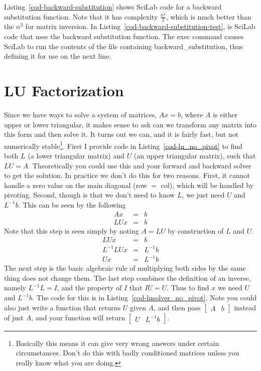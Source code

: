 Listing~\ref{cod-backward-substitution} shows SciLab code for a backward substitution function.  Note that it has complexity $\frac{n^2}{2}$, which is much better than the $n^3$ for matrix inversion.  In Listing~\ref{cod-backward-substitution-test}, is SciLab code that uses the backward substitution function.  The exec command causes SciLab to run the contents of the file containing backward\_substitution, thus defining it for use on the next line.

\section{LU Factorization}

Since we have ways to solve a system of matrices, $Ax=b$, where $A$ is either upper or lower triangular, it makes sense to ask can we transform any matrix into this form and then solve it.  It turns out we can, and it is fairly fast, but not numerically stable\footnote{Basically this means it can give very wrong answers under certain circumstances.  Don't do this with badly conditioned matrices unless you really know what you are doing.}.  First I provide code in Listing~\ref{cod-lu_no_pivot} to find both $L$ (a lower triangular matrix) and $U$ (an upper triangular matrix), such that $LU=A$.  Theoretically you could use this and your forward and backward solver to get the solution.  In practice we don't do this for two reasons.  First, it cannot handle a zero value on the main diagonal (row $=$ col), which will be handled by pivoting.  Second, though is that we don't need to know $L$, we just need $U$ and $L^{-1}b$.  This can be seen by the following
\begin{eqnarray}
Ax &=& b \\
LUx &=& b
\end{eqnarray}
Note that this step is seen simply by noting $A=LU$ by construction of $L$ and $U$.
\begin{eqnarray}
LUx &=& b \\
L^{-1}LUx &=& L^{-1}b \\
Ux &=& L^{-1}b
\end{eqnarray}
The next step is the basic algebraic rule of multiplying both sides by the same thing does not change them.  The last step combines the definition of an inverse, namely $L^{-1}L=I$, and the property of $I$ that $IU=U$.  Thus to find $x$ we need $U$ and $L^{-1}b$.  The code for this is in Listing~\ref{cod-lusolver_no_pivot}.  Note you could also just write a function that returns $U$ given $A$, and then pass $\left[\begin{matrix}A & b\end{matrix}\right]$ instead of just $A$, and your function will return $\left[\begin{matrix}U & L^{-1}b\end{matrix}\right]$.

